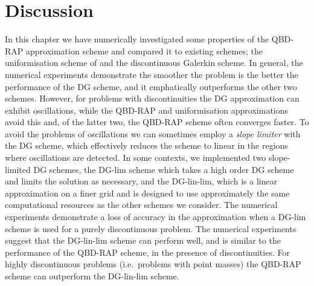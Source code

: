 \section{Discussion}
In this chapter we have numerically investigated some properties of the QBD-RAP approximation scheme and compared it to existing schemes; the uniformisation scheme of \cite{bo2013} and the discontinuous Galerkin scheme. In general, the numerical experiments demonstrate the smoother the problem is the better the performance of the DG scheme, and it emphatically outperforms the other two schemes. However, for problems with discontinuities the DG approximation can exhibit oscillations, while the QBD-RAP and uniformisation approximations avoid this and, of the latter two, the QBD-RAP scheme often converges faster. To avoid the problems of oscillations we can sometimes employ a \emph{slope limiter} with the DG scheme, which effectively reduces the scheme to linear in the regions where oscillations are detected. In some contexts, we implemented two slope-limited DG schemes, the DG-lim scheme which takes a high order DG scheme and limits the solution as necessary, and the DG-lin-lim, which is a linear approximation on a finer grid and is designed to use approximately the same computational resources as the other schemes we consider. The numerical experiments demonstrate a loss of accuracy in the approximation when a DG-lim scheme is used for a purely discontinuous problem. The numerical experiments suggest that the DG-lin-lim scheme can perform well, and is similar to the performance of the QBD-RAP scheme, in the presence of discontinuities. For highly discontinuous problems (i.e.~problems with point masses) the QBD-RAP scheme can outperform the DG-lin-lim scheme. %

